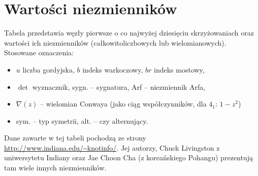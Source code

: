 \section{Wartości niezmienników}
\label{sec:table_of_invariants}
Tabela przedstawia węzły pierwsze o co najwyżej dziesięciu skrzyżowaniach oraz wartości ich niezmienników (całkowitoliczbowych lub wielomianowych).
Stosowane oznaczenia:
\begin{itemize}
	\item $u$ liczba gordyjska, $b$ indeks warkoczowy, $br$ indeks mostowy,
	\item $\det$ wyznacznik, sygn. -- sygnatura, Arf -- niezmiennik Arfa,
	\item $\nabla(z)$ -- wielomian Conwaya (jako ciąg współczynników, dla $4_1$: $1-z^2$)
	\item sym. -- typ symetrii, alt. -- czy alternujący.
\end{itemize}

Dane zawarte w tej tabeli pochodzą ze strony \url{http://www.indiana.edu/~knotinfo/}.
Jej autorzy, Chuck Livingston z uniwersytetu Indiany  oraz Jae Choon Cha (z koreańskiego Pohangu) prezentują tam wiele innych niezmienników.

